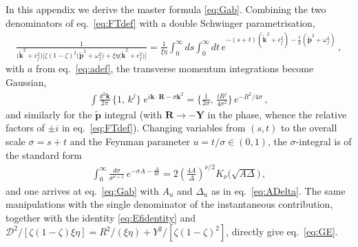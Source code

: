 \documentclass[11pt,a4paper]{article}
\newcommand{\calD}{\mathcal{D}}
\newcommand{\vR}{\bm{R}}
\newcommand{\vY}{\bm{Y}}
\newcommand{\vk}{\bm{k}}
\newcommand{\kt}{\widetilde{\bm{k}}}
\newcommand{\pt}{\widetilde{\bm{p}}}
\newcommand{\eps}{\epsilon}
\numberwithin{equation}{section}
\begin{document}
In this appendix we derive the master formula \eqref{eq:Gab}. Combining the two denominators
of eq.~\eqref{eq:FTdef} with a double Schwinger parametrisation,
\begin{align}
\label{eq:schwinger}
\frac{1}{\big(\kt^{2}+\eps^{2}_{f}\big)
\big[\zeta(1-\zeta)^{2}\big(\pt^{2}+\omega_{f}^{2}\big)
+ \xi\eta\big(\kt^{2} + \eps^{2}_{f}\big)\big]}
= \frac{1}{\xi\eta} \int_{0}^{\infty} ds \int_{0}^{\infty} dt\,
e^{-(s+t)(\kt^{2}+\eps^{2}_{f})-\frac{t}{a}(\pt^{2}+\omega^{2}_{f})}\,,
\end{align}
with $a$ from eq.~\eqref{eq:adef}, the transverse momentum integrations become Gaussian,
\begin{align}
\int \frac{d^{2}\vk}{2\pi}\,\{1,\,k^j\}\;e^{i\vk\cdot \vR - \sigma \vk^{2}}
= \Big\{\frac{1}{2\sigma},\,\frac{iR^{j}}{4\sigma^{2}}\Big\}\,e^{-R^{2}/4\sigma}\,,
\end{align}
and similarly for the $\pt$ integral (with $\vR\to-\vY$ in the phase, whence the relative
factors of $\pm i$ in eq.~\eqref{eq:FTdef}). Changing variables from $(s,t)$ to the overall
scale $\sigma = s+t$ and the Feynman parameter $u = t/\sigma\in(0,1)$, the $\sigma$-integral
is of the standard form
\begin{align}
\int_{0}^{\infty} \frac{d\sigma}{\sigma^{\nu+1}}\,
e^{-\sigma A - \frac{\Delta}{4\sigma}} =
2\left(\frac{4A}{\Delta}\right)^{\nu/2} K_{\nu}\big(\sqrt{A\Delta}\big)\,,
\end{align}
and one arrives at eq.~\eqref{eq:Gab} with $A_u$ and $\Delta_u$ as in eq.~\eqref{eq:ADelta}.
The same manipulations with the single denominator of the instantaneous contribution,
together with the identity \eqref{eq:Efidentity} and
$\calD^2/[\zeta(1-\zeta)\xi\eta]=R^{2}/(\xi\eta) + Y^{2}/[\zeta(1-\zeta)^{2}]$, directly give
eq.~\eqref{eq:GE}.
\end{document}
